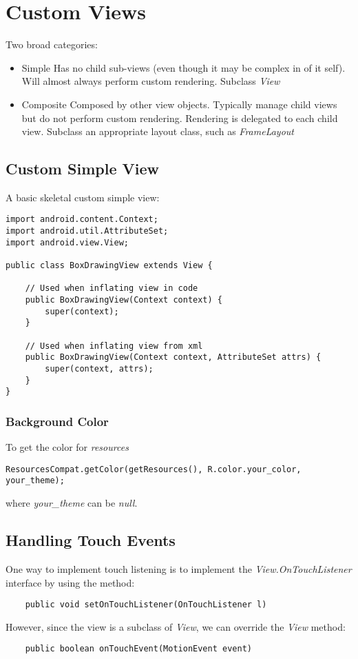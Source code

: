 \documentclass[]{article}
\renewcommand{\it}[1]{\textit{#1}}
\begin{document}
\section{Custom Views}
Two broad categories:
\begin{itemize}
	\item Simple
	\subitem Has no child sub-views (even though it may be complex in of it self).
	\subitem Will almost always perform custom rendering.
	\subitem Subclass \it{View}
	 
	\item Composite
	\subitem Composed by other view objects.
	\subitem Typically manage child views but do not perform custom rendering.
	\subitem Rendering is delegated to each child view.
	\subitem Subclass an appropriate layout class, such as \it{FrameLayout}
\end{itemize}

\subsection{Custom Simple View}
A basic skeletal custom simple view:
\begin{lstlisting}
import android.content.Context;
import android.util.AttributeSet;
import android.view.View;

public class BoxDrawingView extends View {
	
	// Used when inflating view in code
	public BoxDrawingView(Context context) {
		super(context);
	}
	
	// Used when inflating view from xml
	public BoxDrawingView(Context context, AttributeSet attrs) {
		super(context, attrs);
	}
}
\end{lstlisting}

\subsubsection{Background Color}
To get the color for \it{resources}
\begin{lstlisting}
ResourcesCompat.getColor(getResources(), R.color.your_color, your_theme);
\end{lstlisting}
where \it{your\_theme} can be \it{null}.

\subsection{Handling Touch Events}
One way to implement touch listening is to implement the \it{View.OnTouchListener} interface by using the method:
\begin{lstlisting}
	public void setOnTouchListener(OnTouchListener l)
\end{lstlisting}
However, since the view is a subclass of \it{View}, we can override the \it{View} method:
\begin{lstlisting}
	public boolean onTouchEvent(MotionEvent event) 
\end{lstlisting}
\end{document}
